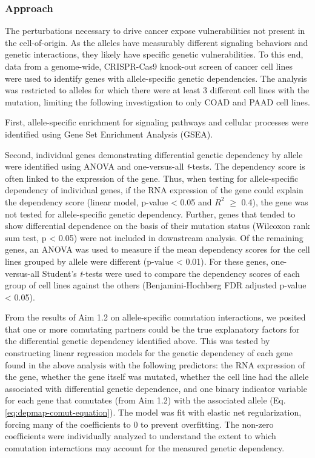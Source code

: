 \subsubsection*{Approach}

The perturbations necessary to drive cancer expose vulnerabilities not present in the cell-of-origin.
As the \KRAS{} alleles have measurably different signaling behaviors and genetic interactions, they likely have specific genetic vulnerabilities.
To this end, data from a genome-wide, CRISPR-Cas9 knock-out screen of cancer cell lines \cite{Tsherniak2017, Meyers2017} were used to identify genes with \KRAS{} allele-specific genetic dependencies.
The analysis was restricted to \KRAS{} alleles for which there were at least 3 different cell lines with the mutation, limiting the following investigation to only COAD and PAAD cell lines.

First, allele-specific enrichment for signaling pathways and cellular processes were identified using Gene Set Enrichment Analysis (GSEA).

Second, individual genes demonstrating differential genetic dependency by \KRAS{} allele were identified using ANOVA and one-versus-all \emph{t}-tests.
The dependency score is often linked to the expression of the gene.
Thus, when testing for allele-specific dependency of individual genes, if the RNA expression of the gene could explain the dependency score (linear model, p-value < 0.05 and $R^2$ $\ge$ 0.4), the gene was not tested for \KRAS{} allele-specific genetic dependency.
Further, genes that tended to show differential dependence on the basis of their mutation status (Wilcoxon rank sum test, p < 0.05) were not included in downstream analysis.
Of the remaining genes, an ANOVA was used to measure if the mean dependency scores for the cell lines grouped by \KRAS{} allele were different (p-value < 0.01).
For these genes, one-versus-all Student's \emph{t}-tests were used to compare the dependency scores of each group of cell lines against the others (Benjamini-Hochberg FDR adjusted p-value < 0.05).

From the results of Aim 1.2 on allele-specific comutation interactions, we posited that one or more comutating partners could be the true explanatory factors for the differential genetic dependency identified above.
This was tested by constructing linear regression models for the genetic dependency of each gene found in the above analysis with the following predictors: the RNA expression of the gene, whether the gene itself was mutated, whether the cell line had the \KRAS{} allele associated with differential genetic dependence, and one binary indicator variable for each gene that comutates (from Aim 1.2) with the associated \KRAS{} allele (Eq. \ref{eq:depmap-comut-equation}).
The model was fit with elastic net regularization, forcing many of the coefficients to 0 to prevent overfitting.
The non-zero coefficients were individually analyzed to understand the extent to which comutation interactions may account for the measured genetic dependency.


